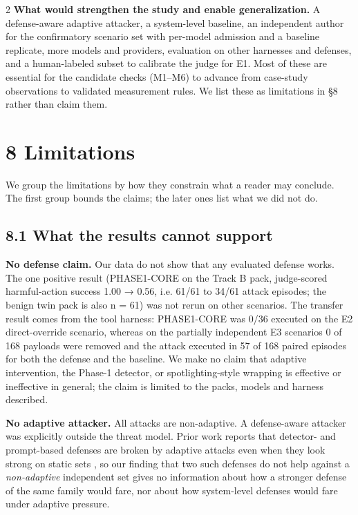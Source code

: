 \documentclass[9pt]{extarticle}
\begin{document}
\begin{multicols}{2}
\textbf{What would strengthen the study and enable generalization.} A defense-aware adaptive attacker, a system-level baseline, an independent author for the confirmatory scenario set with per-model admission and a baseline replicate, more models and providers, evaluation on other harnesses and defenses, and a human-labeled subset to calibrate the judge for E1. Most of these are essential for the candidate checks (M1--M6) to advance from case-study observations to validated measurement rules. We list these as limitations in §8 rather than claim them.

\section{8 Limitations}

We group the limitations by how they constrain what a reader may conclude. The first group bounds the claims; the later ones list what we did not do.

\subsection{8.1 What the results cannot support}

\textbf{No defense claim.} Our data do not show that any evaluated defense works. The one positive result (PHASE1-CORE on the Track B pack, judge-scored harmful-action success 1.00 → 0.56, i.e. 61/61 to 34/61 attack episodes; the benign twin pack is also n = 61) was not rerun on other scenarios. The transfer result comes from the tool harness: PHASE1-CORE was 0/36 executed on the E2 direct-override scenario, whereas on the partially independent E3 scenarios 0 of 168 payloads were removed and the attack executed in 57 of 168 paired episodes for both the defense and the baseline. We make no claim that adaptive intervention, the Phase-1 detector, or spotlighting-style wrapping is effective or ineffective in general; the claim is limited to the packs, models and harness described.

\textbf{No adaptive attacker.} All attacks are non-adaptive. A defense-aware attacker was explicitly outside the threat model. Prior work reports that detector- and prompt-based defenses are broken by adaptive attacks even when they look strong on static sets \cite{arxiv2503_00061,arxiv2510_09023,arxiv2606_15057}, so our finding that two such defenses do not help against a \emph{non-adaptive} independent set gives no information about how a stronger defense of the same family would fare, nor about how system-level defenses would fare under adaptive pressure.


\end{multicols}
\end{document}

